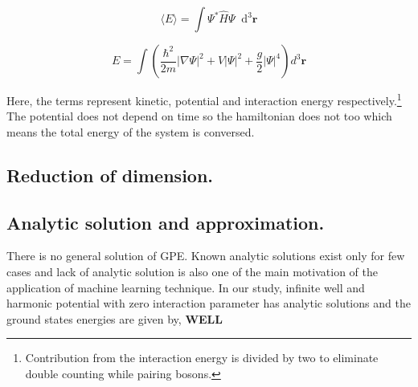 \documentclass[a4paper,times,hidelinks,12pt]{article}
\newcommand*\dif{\mathop{}\!\mathrm{d}}
\begin{document}
\begin{equation}
\label{GPE_total_energy_general}
\langle E \rangle = \int \Psi^{*}\hat{H}\Psi \dif^3\boldsymbol{r}
\end{equation}

\begin{equation}
\label{GPE_total_energy}
E = \int \left(\frac {\hbar^2}{2m}|\nabla
\Psi|^2 + V|\Psi|^2 + \frac{g}{2}|\Psi|^4 \right) d^3\boldsymbol{r}
\end{equation}

Here, the terms represent kinetic, potential and interaction energy respectively.\footnote{Contribution from the interaction energy is divided by two to eliminate double counting while pairing bosons.} The potential does not depend on time so the hamiltonian does not too which means the total energy of the system is conversed. 

 
\subsection{Reduction of dimension.}
\subsection{Analytic solution and approximation.}

There is no general solution of GPE. Known analytic solutions exist only for few cases and lack of analytic solution is also one of the main motivation of the application of machine learning technique. In our study, infinite well and harmonic potential with zero interaction parameter has analytic solutions and the ground states energies are given by, \textbf{WELL}
\end{document}
